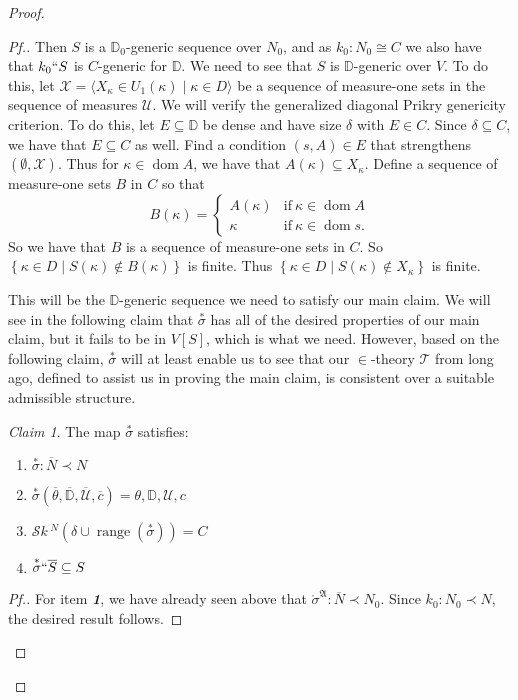 \documentclass{amsart}
\theoremstyle{definition}
\theoremstyle{remark}
\newtheorem{claimno}{Claim}
\newcommand{\D}{\mathbb{D}}
\newcommand{\N}{{\overline{N}}}
\renewcommand{\S}{{\overline{S}}}
\newcommand{\U}{\mathcal{U}}
\DeclareMathOperator{\ran}{range}
\DeclareMathOperator{\dom}{dom}
\newcommand{\st}{\; | \;}
\newcommand{\set}[2]{\left\{#1\st #2 \right\}}
\newcommand{\seq}[2]{\langle #1 \st #2 \rangle}
\newcommand{\SH}{\mathcal{S}\textit{k} \,}
\newcommand{\sk}[3]{\SH^{#1}( {#2} \cup {\ran(#3)} ) }
\begin{document}
\begin{proof}
\begin{proof}[Pf.]
Then $S$ is a $\D_0$-generic sequence over $N_0$, and as $k_0:N_0 \cong C$ we also have that $k_0``S$ is $C$-generic for $\D$. We need to see that $S$ is $\D$-generic over $V$. To do this, let $\mathcal X = \seq{ X_\kappa \in U_1(\kappa) }{ \kappa \in D }$ be a sequence of measure-one sets in the sequence of measures $\U$. We will verify the generalized diagonal Prikry genericity criterion. To do this, let $E \subseteq \D$ be dense and have size $\delta$ with $E \in C$. Since $\delta \subseteq C$, we have that $E \subseteq C$ as well. Find a condition $(s,A) \in E$ that strengthens $(\emptyset, \mathcal X)$. Thus for $\kappa \in \dom A$, we have that $A(\kappa) \subseteq X_\kappa$. Define a sequence of measure-one sets $B$ in $C$ so that 
$$B(\kappa) = \begin{cases} A(\kappa) &\text{if} \ \kappa \in \dom A \\ \kappa &\text{if} \ \kappa \in \dom s. \end{cases}$$
So we have that $B$ is a sequence of measure-one sets in $C$. So $\set{ \kappa \in D }{S(\kappa) \notin B(\kappa) }$ is finite. Thus $\set{\kappa \in D}{ S(\kappa) \notin X_\kappa}$ is finite.


This will be the $\D$-generic sequence we need to satisfy our main claim. We will see in the following claim that $\overset{*} \sigma$ has all of the desired properties of our main claim, but it fails to be in $V[S]$, which is what we need. However, based on the following claim, $\overset{*}{\sigma}$ will at least enable us to see that our $\in$-theory $\mathcal T$ from long ago, defined to assist us in proving the main claim, is consistent over a suitable admissible structure.
\begin{claimno} The map $\overset{*}{\sigma}$ satisfies:
\begin{enumerate}
	\item $\overset{*} {\sigma}: \N \prec N$
	\item $\overset{*} {\sigma}(\overline \theta, \overline{\D}, \overline{\U}, \overline c)=\theta, \D, \U, c$
	\item $\sk{N}{\delta}{\overset{*}{\sigma}} = C$	
	\item $\overset{*} {\sigma} `` \S \subseteq S$
\end{enumerate}
\end{claimno}
\begin{proof}[Pf.]
For item \textsl{\textbf{1}}, we have already seen above that $\mathring \sigma^{\mathfrak A}: \N \prec N_0$. Since $k_0:N_0 \prec N$, the desired result follows.


\end{proof}
\end{proof}
\end{proof}
\end{document}
